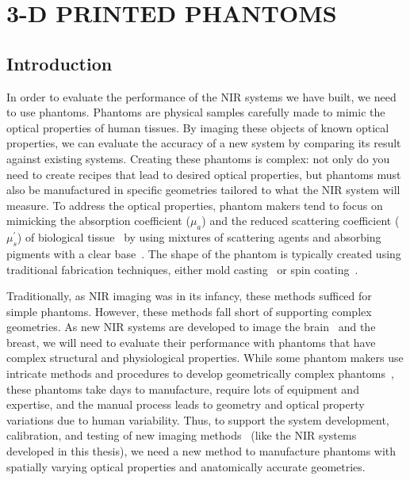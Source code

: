 
\chapter{3-D PRINTED PHANTOMS} %
\label{chap:3dprint}

\section{Introduction}
In order to evaluate the performance of the NIR systems we have built, we need to use phantoms. Phantoms are physical samples carefully made to mimic the optical properties of human tissues\cite{Pogue2006}. By imaging these objects of known optical properties, we can evaluate the accuracy of a new system by comparing its result against existing systems. Creating these phantoms is complex: not only do you need to create recipes that lead to desired optical properties, but phantoms must also be manufactured in specific geometries tailored to what the NIR system will measure. To address the optical properties, phantom makers tend to focus on mimicking the absorption coefficient ($\mu_a$) and the reduced scattering coefficient ($\mu_s^{'}$) of biological tissue~\cite{Dempsey2017} by using mixtures of scattering agents and absorbing pigments with a clear base~\cite{Hebden1995, Dong2015}. The shape of the phantom is typically created using traditional fabrication techniques, either mold casting~\cite{Hahn2012} or spin coating~\cite{Park2013}. 

Traditionally, as NIR imaging was in its infancy, these methods sufficed for simple phantoms. However, these methods fall short of supporting complex geometries. As new NIR systems are developed to image the brain~\cite{Hebden2002, Villringer1997} and the breast, we will need to evaluate their performance with phantoms that have complex structural and physiological properties. While some phantom makers use intricate methods and procedures to develop geometrically complex phantoms~\cite{Mobashsher2014}, these phantoms take days to manufacture, require lots of equipment and expertise, and the manual process leads to  geometry and optical property variations due to human variability. Thus, to support the system development, calibration, and testing of new imaging methods~\cite{Cerussi2012, Diep2015} (like the NIR systems developed in this thesis), we need a new method to manufacture phantoms with spatially varying optical properties and anatomically accurate geometries.

